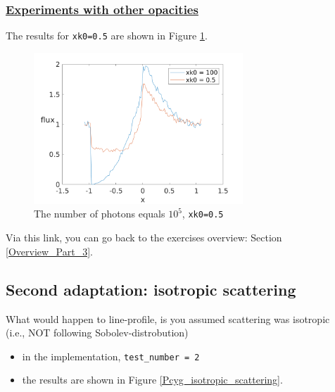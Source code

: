 \documentclass[../main/main.tex]{subfiles}
\begin{document}
\noindent{}
  
\subsubsection{\underline{Experiments with other opacities}}
The results for \texttt{xk0=0.5} are shown in Figure \ref{PCyg_mu_eq_xk0_05_vs_100}.


\begin{figure}[!htbp]
\centering
\includegraphics[width=0.7\textwidth]{../../introductory_exercises/P_Cygni_profile_UV_resonance/data/npot5xk0100alpha0beta1test0.png}
\caption{The number of photons equals $10^{5}$, \texttt{xk0=0.5}}
\label{PCyg_mu_eq_xk0_05_vs_100}
\end{figure}

Via this link, you can go back to the exercises overview: Section \underline{\ref{Overview_Part_3}}.


\newpage
\subsection{Second adaptation: isotropic scattering}
\label{isotropic_scattering}
What would happen to line-profile, is you assumed scattering
was isotropic 
\\(i.e., NOT following Sobolev-distrobution)

\begin{itemize}
\item in the implementation, \texttt{test\_number = 2}
\item the results are shown in Figure \ref{Pcyg_isotropic_scattering}.
\end{itemize}
\end{document}
